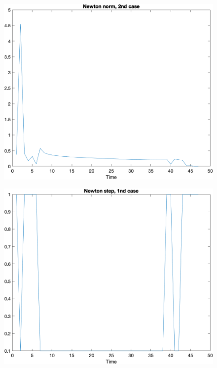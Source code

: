 \documentclass[10pt]{article}
\begin{document}
\begin{figure}[H]
	\centering
	\includegraphics[width=0.55\linewidth]{new2_norm.png}
\end{figure}
\begin{figure}[H]
	\centering
	\includegraphics[width=0.55\linewidth]{new2_step.png}
\end{figure}
\end{document}
